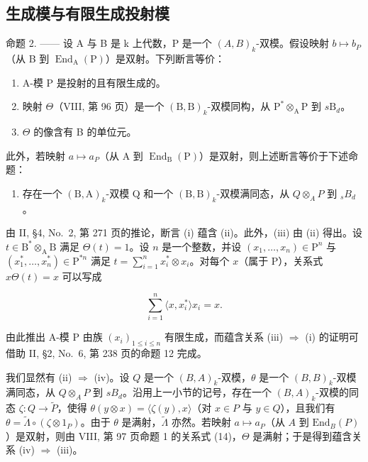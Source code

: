 \subsection{生成模与有限生成投射模}

命题 2. —— 设 A 与 B 是 k 上代数，P 是一个 \((A,B)_{k}\)-双模。假设映射 \(b \mapsto b_{P}\)（从 B 到 \(\operatorname{End}_{\mathrm{A}}(\mathrm{P})\)）是双射。下列断言等价：

\begin{enumerate}
\def\labelenumi{(\roman{enumi})}
\item
  A-模 P 是投射的且有限生成的。
\item
  映射 \(\Theta\)（VIII, 第 96 页）是一个 \((\mathrm{B},\mathrm{B})_k\)-双模同构，从 \(\mathrm{P}^* \otimes_{\mathrm{A}} \mathrm{P}\) 到 \(s\mathrm{B}_d\)。
\item
  \(\Theta\) 的像含有 B 的单位元。
\end{enumerate}

此外，若映射 \(a \mapsto a_{P}\)（从 A 到 \(\operatorname{End}_{\mathrm{B}}(\mathrm{P})\)）是双射，则上述断言等价于下述命题：

\begin{enumerate}
\def\labelenumi{(\roman{enumi})}
\setcounter{enumi}{3}
\tightlist
\item
  存在一个 \((\mathrm{B},\mathrm{A})_{k}\)-双模 Q 和一个 \((\mathrm{B},\mathrm{B})_{k}\)-双模满同态，从 \(Q\otimes_{A}P\) 到 \(_{s}B_{d}\)。
\end{enumerate}

由 II, §4, No.~2, 第 271 页的推论，断言 (i) 蕴含 (ii)。此外，(iii) 由 (ii) 得出。设 \(t \in \mathrm{B}^* \otimes_{\mathrm{A}} \mathrm{B}\) 满足 \(\Theta(t) = 1\)。设 \(n\) 是一个整数，并设 \((x_1, \ldots, x_n) \in \mathrm{P}^n\) 与 \((x_1^*, \ldots, x_n^*) \in \mathrm{P}^{*n}\) 满足 \(t = \sum_{i=1}^{n} x_i^* \otimes x_i\)。对每个 \(x\)（属于 \(\mathrm{P}\)），关系式 \(x\Theta(t) = x\) 可以写成

\[
\sum_ {i = 1} ^ {n} \langle x, x _ {i} ^ {*} \rangle x _ {i} = x.
\]

由此推出 A-模 P 由族 \((x_{i})_{1\leqslant i\leqslant n}\) 有限生成，而蕴含关系 (iii) \(\Rightarrow\) (i) 的证明可借助 II, §2, No.~6, 第 238 页的命题 12 完成。

我们显然有 (ii) \(\Rightarrow\) (iv)。设 \(Q\) 是一个 \((B,A)_k\)-双模，\(\theta\) 是一个 \((B,B)_k\)-双模满同态，从 \(Q \otimes_A P\) 到 \(s B_d\)。沿用上一小节的记号，存在一个 \((B,A)_k\)-双模的同态 \(\zeta: Q \to \widetilde{P}\)，使得 \(\theta(y \otimes x) = \langle \zeta(y), x \rangle\)（对 \(x \in P\) 与 \(y \in Q\)），且我们有 \(\theta = \widetilde{\Lambda} \circ (\zeta \otimes 1_P)\)。由于 \(\theta\) 是满射，\(\widetilde{\Lambda}\) 亦然。若映射 \(a \mapsto a_P\)（从 \(A\) 到 \(\mathrm{End}_B(P)\)）是双射，则由 VIII, 第 97 页命题 1 的关系式 (14)，\(\Theta\) 是满射；于是得到蕴含关系 (iv) \(\Rightarrow\) (iii)。

